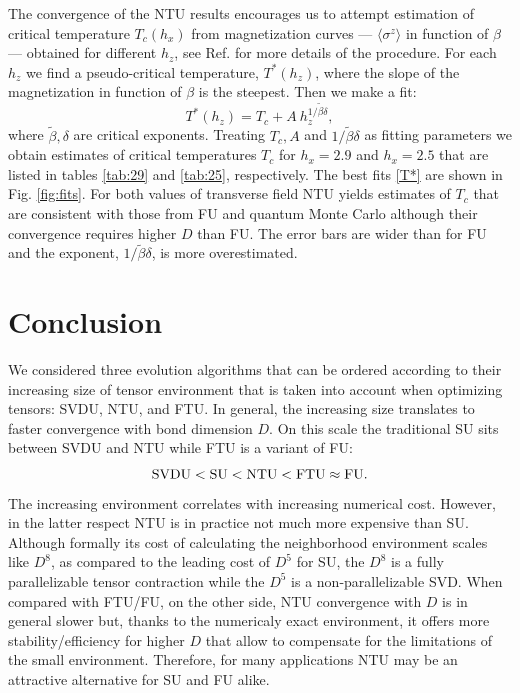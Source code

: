 \documentclass[prb,twocolumn,showkeys,showpacs,amsmath,amsfonts,floatfix,superscriptaddress,nofootinbib]{revtex4-1}
\def\be{\begin{equation}}
\def\ee{\end{equation}}
\begin{document}
The convergence of the NTU results encourages us to attempt estimation of critical temperature $T_c(h_x)$ from magnetization curves --- $\langle\sigma^z\rangle$ in function of $\beta$ --- obtained for different $h_z$, see Ref. \cite{CzarnikDziarmagaCorboz} for more details of the procedure. For each $h_z$ we find a pseudo-critical temperature, $T^*(h_z)$, where the slope of the magnetization in function of $\beta$ is the steepest. Then we make a fit:
\be 
T^*(h_z)=T_c+A~ h_z^{1/\tilde\beta\delta},
\label{T*}
\ee 
where $\tilde\beta,\delta$ are critical exponents. Treating $T_c,A$ and $1/\tilde\beta\delta$ as fitting parameters we obtain estimates of critical temperatures $T_c$ for $h_x=2.9$ and $h_x=2.5$ that are listed in tables \ref{tab:29} and \ref{tab:25}, respectively. The best fits \eqref{T*} are shown in Fig. \ref{fig:fits}. For both values of transverse field NTU yields estimates of $T_c$ that are consistent with those from FU\cite{CzarnikDziarmagaCorboz} and quantum Monte Carlo \cite{Hesselmann_TIsingQMC_16} although their convergence requires higher $D$ than FU. The error bars are wider than for FU and the exponent, $1/\tilde\beta\delta$, is more overestimated. 

\section{Conclusion}
\label{sec:conclusion}

We considered three evolution algorithms that can be ordered according to their increasing size of tensor environment that is taken into account when optimizing tensors: SVDU, NTU, and FTU. In general, the increasing size translates to faster convergence with bond dimension $D$. On this scale the traditional SU sits between SVDU and NTU while FTU is a variant of FU:
$$ 
{\rm SVDU} < {\rm SU} < {\rm NTU} < {\rm FTU} \approx {\rm FU}.
$$
The increasing environment correlates with increasing numerical cost. However, in the latter respect NTU is in practice not much more expensive than SU. Although formally its cost of calculating the neighborhood environment scales like $D^8$, as compared to the leading cost of $D^5$ for SU, the $D^8$ is a fully parallelizable tensor contraction while the $D^5$ is a non-parallelizable SVD. When compared with FTU/FU, on the other side, NTU convergence with $D$ is in general slower but, thanks to the numericaly exact environment, it offers more stability/efficiency for higher $D$ that allow to compensate for the limitations of the small environment. Therefore, for many applications NTU may be an attractive alternative for SU and FU alike.
\end{document}

